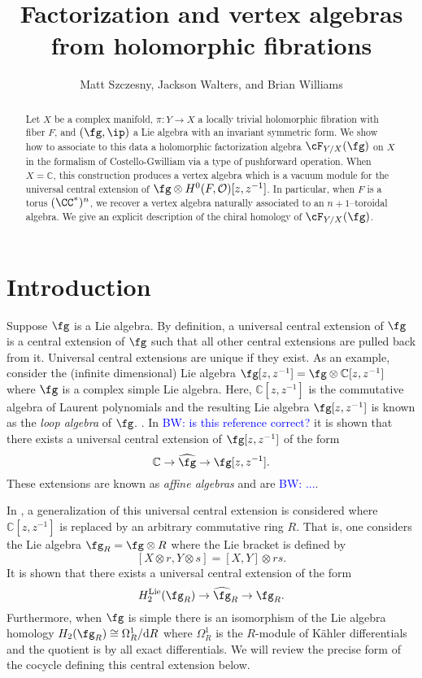 \documentclass[12pt]{amsart}
\theoremstyle{definition}
\theoremstyle{remark}
\newcommand{\mc}{\mathcal}
\def\d{{\rm d}}
\def\tensor{\otimes}
\def\Hat{\widehat}
\def\brian{\textcolor{blue}{BW: }\textcolor{blue}}
\begin{document}
 \title{Factorization and vertex algebras from  holomorphic fibrations}
  \author{Matt Szczesny, Jackson Walters, and Brian Williams}
  \date{}

  
  \maketitle

\begin{abstract}
Let $X$ be a complex manifold, $\pi: Y \rightarrow X$ a locally trivial holomorphic fibration with fiber $F$, and $(\fg, \ip )$ a Lie algebra with an invariant symmetric form. We show how to associate to this data a holomorphic factorization algebra  $\cF_{Y/X}(\fg)$ on $X$ in the formalism of Costello-Gwilliam via a type of pushforward operation. When $X=\mathbb{C}$, this construction produces a vertex algebra which is a vacuum module for the universal central extension of $\fg \otimes H^{0}(F, \mc{O})[z,z^{-1}]$. In particular,  when $F$ is a torus $(\CC^{*})^n$, we recover a vertex algebra naturally associated to an $n+1$--toroidal algebra. We give an explicit description of the chiral homology of $\cF_{Y/X}(\fg)$.
\end{abstract}


\tableofcontents


\section{Introduction}

Suppose $\fg$ is a Lie algebra. 
By definition, a universal central extension of $\fg$ is a central extension of $\fg$ such that all other central extensions are pulled back from it. 
Universal central extensions are unique if they exist. 
As an example, consider the (infinite dimensional) Lie algebra $\fg[z,z^{-1}] = \fg \tensor \mathbb{C}[z,z^{-1}]$ where $\fg$ is a complex simple Lie algebra. 
Here, $\mathbb{C}[z,z^{-1}]$ is the commutative algebra of Laurent polynomials and the resulting Lie algebra $\fg[z,z^{-1}]$ is known as the {\em loop algebra} of $\fg$. . 
In \cite{Garland} \brian{is this reference correct?} it is shown that there exists a universal central extension of $\fg[z,z^{-1}]$ of the form
\[
\mathbb{C} \to \Hat{\fg} \to \fg[z,z^{-1}] .
\]
These extensions are known as {\em affine algebras} and are \brian{...}.

In \cite{Kassel}, a generalization of this universal central extension is considered where $\mathbb{C}[z,z^{-1}]$ is replaced by an arbitrary commutative ring $R$. 
That is, one considers the Lie algebra $\fg_R = \fg \tensor R$ where the Lie bracket is defined by 
\[
[X \tensor r, Y \tensor s] = [X,Y] \tensor rs .
\]
It is shown that there exists a universal central extension of the form
\[
H_2^{\rm Lie}(\fg_R) \to \Hat{\fg}_R \to \fg_R .
\]
Furthermore, when $\fg$ is simple there is an isomorphism of the Lie algebra homology $H_2(\fg_R) \cong \Omega^1_R / \d R$ where $\Omega^1_R$ is the $R$-module of K\"{a}hler differentials and the quotient is by all exact differentials. 
We will review the precise form of the cocycle defining this central extension below. 
\end{document}
